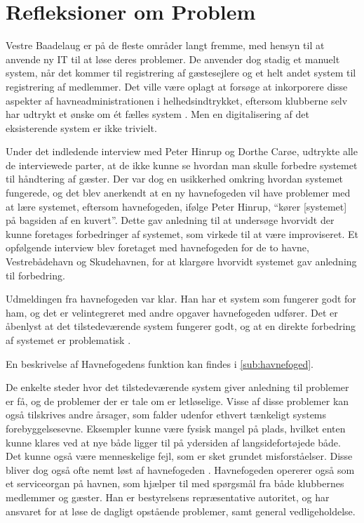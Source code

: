\section{Refleksioner om Problem}
Vestre Baadelaug er på de fleste områder langt fremme, med hensyn til at anvende ny IT til at løse deres problemer. De anvender dog stadig et manuelt system, når det kommer til registrering af gæstesejlere og et helt andet system til registrering af medlemmer. Det ville være oplagt at forsøge at inkorporere disse aspekter af havneadministrationen i helhedsindtrykket, eftersom klubberne selv har udtrykt et ønske om ét fælles system \cite{int_vb_sl}. Men en digitalisering af det eksisterende system er ikke trivielt.

Under det indledende interview med Peter Hinrup og Dorthe Carøe, udtrykte alle de interviewede parter, at de ikke kunne se hvordan man skulle forbedre systemet til håndtering af gæster. Der var dog en usikkerhed omkring hvordan systemet fungerede, og det blev anerkendt at en ny havnefogeden vil have problemer med at lære systemet, eftersom havnefogeden, ifølge Peter Hinrup, \enquote{kører [systemet] på bagsiden af en kuvert}. Dette gav anledning til at undersøge hvorvidt der kunne foretages forbedringer af systemet, som virkede til at være improviseret. Et opfølgende interview blev foretaget med havnefogeden for de to havne, Vestrebådehavn og Skudehavnen, for at klargøre hvorvidt systemet gav anledning til forbedring.

Udmeldingen fra havnefogeden var klar. Han har et system som fungerer godt for ham, og det er velintegreret med andre opgaver havnefogeden udfører. Det er åbenlyst at det tilstedeværende system fungerer godt, og at en direkte forbedring af systemet er problematisk \cite{int_hf}. 

En beskrivelse af Havnefogedens funktion kan findes i \cref{sub:havnefoged}.

De enkelte steder hvor det tilstedeværende system giver anledning til problemer er få, og de problemer der er tale om er letløselige. Visse af disse problemer kan også tilskrives andre årsager, som falder udenfor ethvert tænkeligt systems forebyggelsesevne. Eksempler kunne være fysisk mangel på plads, hvilket enten kunne klares ved at nye både ligger til på ydersiden af langsidefortøjede både. Det kunne også være menneskelige fejl, som er sket grundet misforståelser. Disse bliver dog også ofte nemt løst af havnefogeden \cite{int_hf}. Havnefogeden opererer også som et serviceorgan på havnen, som hjælper til med spørgsmål fra både klubbernes medlemmer og gæster. Han er bestyrelsens repræsentative autoritet, og har ansvaret for at løse de dagligt opstående problemer, samt general vedligeholdelse. 

